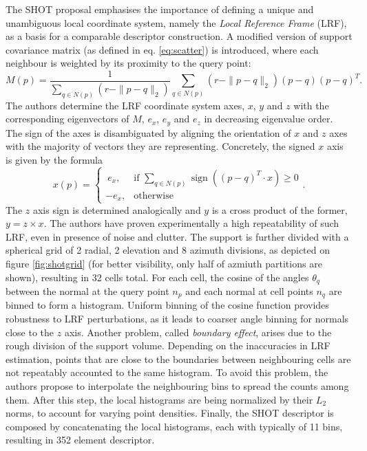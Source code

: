 The SHOT proposal emphasises the importance of defining a unique and unambiguous local coordinate system, namely the \textit{Local Reference Frame} (LRF), as a basis for a comparable descriptor construction. A modified version of support covariance matrix (as defined in eq. \ref{eq:scatter}) is introduced, where each neighbour is weighted by its proximity to the query point: 
\begin{equation}
\label{eq:weighCov}
M(p) = \frac{1}{\sum\limits_{q\in N(p)}(r - \|p-q\|_2)} \sum\limits_{q\in N(p)}(r - \|p-q\|_2)(p - q)(p - q)^T.
\end{equation}
The authors determine the LRF coordinate system axes, $x$, $y$ and $z$ with the corresponding eigenvectors of $M$, $e_x$, $e_y$ and $e_z$ in decreasing eigenvalue order. The sign of the axes is disambiguated by aligning the orientation of $x$ and $z$ axes with the majority of vectors they are representing. Concretely, the signed $x$ axis is given by the formula
\begin{equation}
x(p) = \begin{cases}\ e_x, & \mbox{if } \sum\limits_{q \in N(p)} \operatorname{sign}\left( (p-q)^T \cdot x \right) \geq 0 \\ -e_x, & \mbox{otherwise} \end{cases}.
\end{equation}
The $z$ axis sign is determined analogically and $y$ is a cross product of the former, $y = z \times x$. The authors have proven experimentally a high repeatability of such LRF, even in presence of noise and clutter. The support is further divided with a spherical grid of 2 radial, 2 elevation and 8 azimuth divisions, as depicted on figure \ref{fig:shotgrid} (for better visibility, only half of azmiuth partitions are shown), resulting in 32 cells total.  For each cell, the cosine of the angles $\theta_q$ between the normal at the query point $n_p$ and each normal at cell points $n_q$ are binned to form a histogram. Uniform binning of the cosine function provides robustness to LRF perturbations, as it leads to coarser angle binning for normals close to the $z$ axis. Another problem, called \textit{boundary effect}, arises due to the rough division of the support volume. Depending on the inaccuracies in LRF estimation, points that are close to the boundaries between neighbouring cells are not repeatably accounted to the same histogram. To avoid this problem, the authors propose to interpolate the neighbouring bins to spread the counts among them. After this step, the local histograms are being normalized by their $L_2$ norms, to account for varying point densities. Finally, the SHOT descriptor is composed by concatenating the local histograms, each with typically of 11 bins, resulting in 352 element descriptor.

